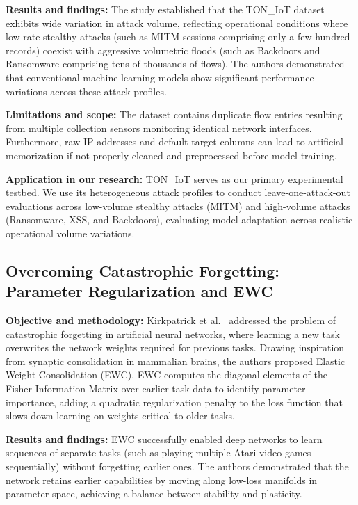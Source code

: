\smallskip
\noindent\textbf{Results and findings:} The study established that the TON\_IoT dataset exhibits wide variation in attack volume, reflecting operational conditions where low-rate stealthy attacks (such as MITM sessions comprising only a few hundred records) coexist with aggressive volumetric floods (such as Backdoors and Ransomware comprising tens of thousands of flows). The authors demonstrated that conventional machine learning models show significant performance variations across these attack profiles.

\smallskip
\noindent\textbf{Limitations and scope:} The dataset contains duplicate flow entries resulting from multiple collection sensors monitoring identical network interfaces. Furthermore, raw IP addresses and default target columns can lead to artificial memorization if not properly cleaned and preprocessed before model training.

\smallskip
\noindent\textbf{Application in our research:} TON\_IoT serves as our primary experimental testbed. We use its heterogeneous attack profiles to conduct leave-one-attack-out evaluations across low-volume stealthy attacks (MITM) and high-volume attacks (Ransomware, XSS, and Backdoors), evaluating model adaptation across realistic operational volume variations.

\subsection{Overcoming Catastrophic Forgetting: Parameter Regularization and EWC}

\noindent\textbf{Objective and methodology:} Kirkpatrick et al.~\cite{kirkpatrick2017overcoming} addressed the problem of catastrophic forgetting in artificial neural networks, where learning a new task overwrites the network weights required for previous tasks. Drawing inspiration from synaptic consolidation in mammalian brains, the authors proposed Elastic Weight Consolidation (EWC). EWC computes the diagonal elements of the Fisher Information Matrix over earlier task data to identify parameter importance, adding a quadratic regularization penalty to the loss function that slows down learning on weights critical to older tasks.

\smallskip
\noindent\textbf{Results and findings:} EWC successfully enabled deep networks to learn sequences of separate tasks (such as playing multiple Atari video games sequentially) without forgetting earlier ones. The authors demonstrated that the network retains earlier capabilities by moving along low-loss manifolds in parameter space, achieving a balance between stability and plasticity.

